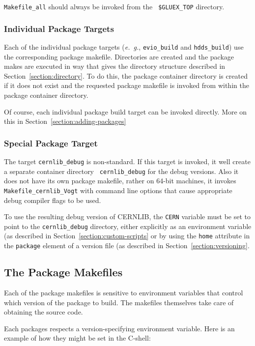 \documentclass[12pt]{article}
\begin{document}
{{\tt Makefile\_all}} should always be invoked from the {\tt
  \$GLUEX\_TOP} directory.

\subsubsection{Individual Package Targets}

Each of the individual package targets ({\it e.~g.}, {\tt evio\_build}
and {\tt hdds\_build}) use the corresponding package
makefile. Directories are created and the package makes are executed
in way that gives the directory structure described in
Section~\ref{section:directory}. To do this, the package container
directory is created if it does not exist and the requested package
makefile is invoked from within the package container directory.

Of course, each individual package build target can be invoked
directly. More on this in Section~\ref{section:adding-packages}

\subsubsection{Special Package Target}

The target {\tt cernlib\_debug} is non-standard. If this target is
invoked, it well create a separate container directory {\tt
  cernlib\_debug} for the debug versions. Also it does not have its
own package makefile, rather on 64-bit machines, it invokes {\tt
  Makefile\_cernlib\_Vogt} with command line options that cause
appropriate debug compiler flags to be used.

To use the resulting debug version of CERNLIB, the {\tt CERN} variable
must be set to point to the {\tt cernlib\_debug} directory, either explicitly as an environment variable (as described in Section~\ref{section:custom-scripts} or by using the {\tt home} attribute in the {\tt package} element of a version file (as described in Section~\ref{section:versioning}.

\subsection{The Package Makefiles}\label{section:package-makefiles}

Each of the package makefiles is sensitive to environment variables
that control which version of the package to build. The makefiles
themselves take care of obtaining the source code.

Each packages respects a version-specifying environment variable. Here
is an example of how they might be set in the C-shell:
\end{document}
